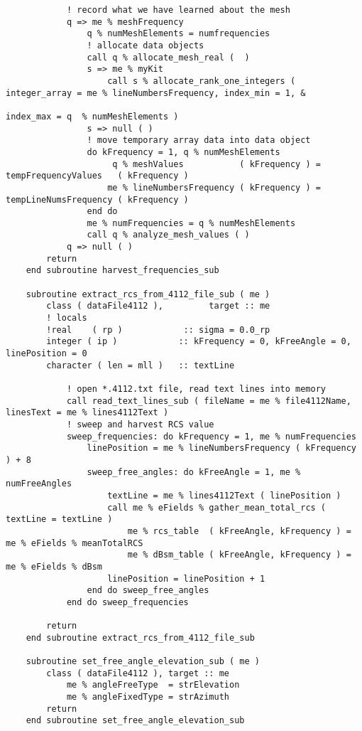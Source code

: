 {{\begin{lstlisting}
            ! record what we have learned about the mesh
            q => me % meshFrequency
                q % numMeshElements = numfrequencies
                ! allocate data objects
                call q % allocate_mesh_real (  )
                s => me % myKit
                    call s % allocate_rank_one_integers ( integer_array = me % lineNumbersFrequency, index_min = 1, &
                                                              index_max = q  % numMeshElements )
                s => null ( )
                ! move temporary array data into data object
                do kFrequency = 1, q % numMeshElements
                     q % meshValues           ( kFrequency ) = tempFrequencyValues   ( kFrequency )
                    me % lineNumbersFrequency ( kFrequency ) = tempLineNumsFrequency ( kFrequency )
                end do
                me % numFrequencies = q % numMeshElements
                call q % analyze_mesh_values ( )
            q => null ( )
        return
    end subroutine harvest_frequencies_sub

    subroutine extract_rcs_from_4112_file_sub ( me )
        class ( dataFile4112 ),         target :: me
        ! locals
        !real    ( rp )            :: sigma = 0.0_rp
        integer ( ip )            :: kFrequency = 0, kFreeAngle = 0, linePosition = 0
        character ( len = mll )   :: textLine

            ! open *.4112.txt file, read text lines into memory
            call read_text_lines_sub ( fileName = me % file4112Name, linesText = me % lines4112Text )
            ! sweep and harvest RCS value
            sweep_frequencies: do kFrequency = 1, me % numFrequencies
                linePosition = me % lineNumbersFrequency ( kFrequency ) + 8
                sweep_free_angles: do kFreeAngle = 1, me % numFreeAngles
                    textLine = me % lines4112Text ( linePosition )
                    call me % eFields % gather_mean_total_rcs ( textLine = textLine )
                        me % rcs_table  ( kFreeAngle, kFrequency ) = me % eFields % meanTotalRCS
                        me % dBsm_table ( kFreeAngle, kFrequency ) = me % eFields % dBsm
                    linePosition = linePosition + 1
                end do sweep_free_angles
            end do sweep_frequencies

        return
    end subroutine extract_rcs_from_4112_file_sub

    subroutine set_free_angle_elevation_sub ( me )
        class ( dataFile4112 ), target :: me
            me % angleFreeType  = strElevation
            me % angleFixedType = strAzimuth
        return
    end subroutine set_free_angle_elevation_sub


\end{lstlisting}}}
